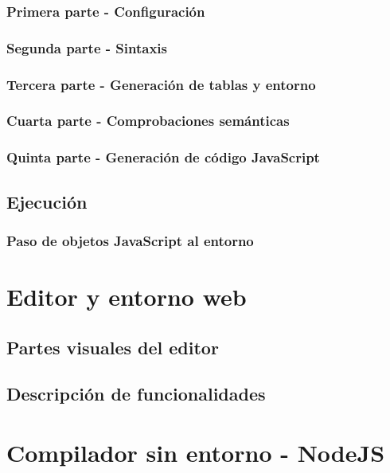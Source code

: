 \documentclass{report}
\begin{document}
	\subsection{Primera parte - Configuración}
	
	\subsection{Segunda parte - Sintaxis}
	
	\subsection{Tercera parte - Generación de tablas y entorno}
	
	\subsection{Cuarta parte - Comprobaciones semánticas}
	
	\subsection{Quinta parte - Generación de código JavaScript}
	
	\section{Ejecución}
	
	\subsection{Paso de objetos JavaScript al entorno}
	
	\chapter{Editor y entorno web}
	
	\section{Partes visuales del editor}
	
	\section{Descripción de funcionalidades}
	
	\chapter{Compilador sin entorno - NodeJS}
	
\end{document}
